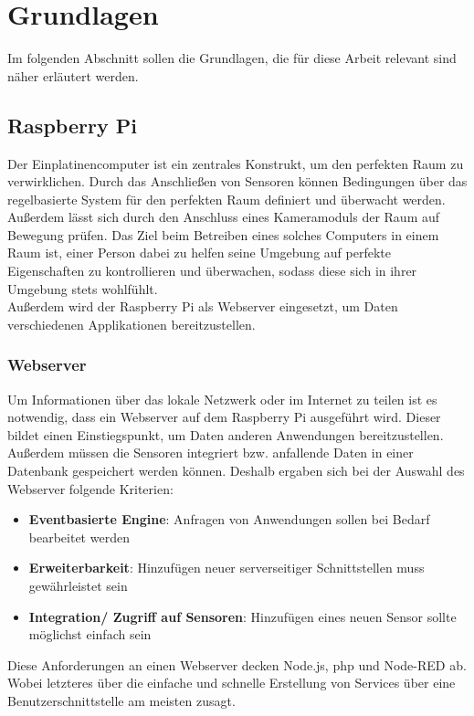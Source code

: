 \chapter{Grundlagen}
Im folgenden Abschnitt sollen die Grundlagen, die für diese Arbeit relevant sind näher erläutert werden.

\section{Raspberry Pi} 
Der Einplatinencomputer ist ein zentrales Konstrukt, um den perfekten Raum zu verwirklichen. Durch das Anschließen von Sensoren können Bedingungen über das regelbasierte System für den perfekten Raum definiert und überwacht werden. Außerdem lässt sich durch den Anschluss eines Kameramoduls der Raum auf Bewegung prüfen. Das Ziel beim Betreiben eines solches Computers in einem Raum ist, einer Person dabei zu helfen seine Umgebung auf perfekte Eigenschaften zu kontrollieren und überwachen, sodass diese sich in ihrer Umgebung stets wohlfühlt. 
\\Außerdem wird der Raspberry Pi als Webserver eingesetzt, um Daten verschiedenen Applikationen bereitzustellen. 

\subsection{Webserver}
Um Informationen über das lokale Netzwerk oder im Internet zu teilen ist es notwendig, dass ein Webserver auf dem Raspberry Pi ausgeführt wird. Dieser bildet einen Einstiegspunkt, um Daten anderen Anwendungen bereitzustellen. Außerdem müssen die Sensoren integriert bzw. anfallende Daten in einer Datenbank gespeichert werden können. Deshalb ergaben sich bei der Auswahl des Webserver folgende Kriterien:
\begin{itemize}
	\item \textbf{Eventbasierte Engine}: Anfragen von Anwendungen sollen bei Bedarf bearbeitet werden
	\item \textbf{Erweiterbarkeit}: Hinzufügen neuer serverseitiger Schnittstellen muss gewährleistet sein
	\item \textbf{Integration/ Zugriff auf Sensoren}: Hinzufügen eines neuen Sensor sollte möglichst einfach sein
\end{itemize} 
Diese Anforderungen an einen Webserver decken Node.js, php und Node-RED ab. Wobei letzteres über die einfache und schnelle Erstellung von Services über eine Benutzerschnittstelle am meisten zusagt.
